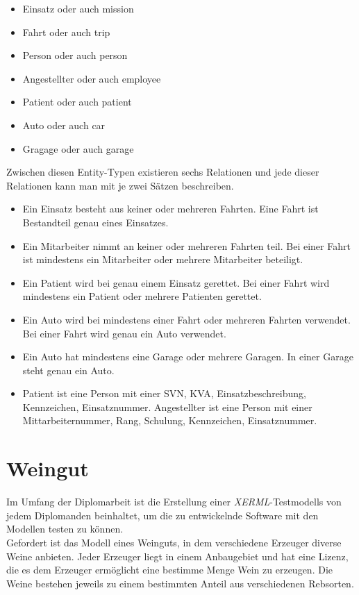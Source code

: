 \begin{itemize}
    \item Einsatz oder auch mission
    \item Fahrt oder auch trip
    \item Person oder auch person
    \item Angestellter oder auch employee
    \item Patient oder auch patient
    \item Auto oder auch car
    \item Gragage oder auch garage
\end{itemize}

\noindent
Zwischen diesen Entity-Typen existieren sechs Relationen und jede dieser Relationen kann man mit je zwei Sätzen beschreiben.
\begin{itemize}
    \item Ein Einsatz besteht aus keiner oder mehreren Fahrten.\newline
          Eine Fahrt ist Bestandteil genau eines Einsatzes.
    \item Ein Mitarbeiter nimmt an keiner oder mehreren Fahrten teil. \newline
          Bei einer Fahrt ist mindestens ein Mitarbeiter oder mehrere Mitarbeiter beteiligt. 
    \item Ein Patient wird bei genau einem Einsatz gerettet. \newline
          Bei einer Fahrt wird mindestens ein Patient oder mehrere Patienten gerettet. 
    \item Ein Auto wird bei mindestens einer Fahrt oder mehreren Fahrten verwendet. \newline
          Bei einer Fahrt wird genau ein Auto verwendet.
    \item Ein Auto hat mindestens eine Garage oder mehrere Garagen. \newline
          In einer Garage steht genau ein Auto.
    \item Patient ist eine Person mit einer SVN, KVA, Einsatzbeschreibung, Kennzeichen, Einsatznummer. \newline
          Angestellter ist eine Person mit einer Mittarbeiternummer, Rang, Schulung, Kennzeichen, Einsatznummer.
\end{itemize}

\noindent

\newpage


\section{Weingut}
\hon{}
\noindent
Im Umfang der Diplomarbeit ist die Erstellung einer \textit{XERML}-Testmodells von jedem Diplomanden beinhaltet, um die zu entwickelnde Software mit den Modellen testen zu können.
\\
\noindent
Gefordert ist das Modell eines Weinguts, in dem verschiedene Erzeuger diverse Weine anbieten. Jeder Erzeuger liegt in einem Anbaugebiet und hat eine Lizenz, die es dem Erzeuger ermöglicht eine bestimme Menge Wein zu erzeugen. Die Weine bestehen jeweils zu einem bestimmten Anteil aus verschiedenen Rebsorten.


